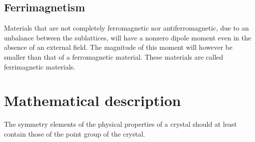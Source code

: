 \subsection{Ferrimagnetism}
	Materials that are not completely ferromagnetic nor antiferromagnetic, due to an unbalance between the sublattices, will have a nonzero dipole moment even in the absence of an external field. The magnitude of this moment will however be smaller than that of a ferromagnetic material. These materials are called ferrimagnetic materials.
    

\section{Mathematical description}
	\begin{theorem}
		The symmetry elements of the physical properties of a crystal should at least contain those of the point group of the crystal.
	\end{theorem}